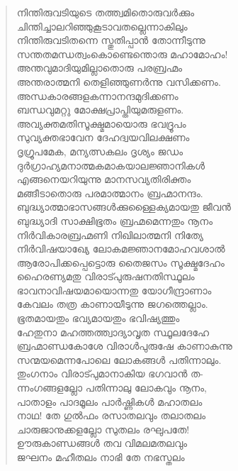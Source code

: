 \begin{verse}
നിന്തിരുവടിയുടെ തത്ത്വമിതൊരുവര്‍ക്കും\\
ചിന്തിച്ചാലറിഞ്ഞുകൂടാവതല്ലെന്നാകിലും\\
നിന്തിരുവടിതന്നെ സ്തുതിപ്പാന്‍ തോന്നീടുന്നു\\
സന്തതമന്ധത്വംകൊണ്ടെന്തൊരു മഹാമോഹം!\\
അന്തവുമാദിയുമില്ലാതൊരു പരബ്രഹ്മം\\
അന്തരാത്മനി തെളിഞ്ഞുണര്‍ന്നു വസിക്കണം.\\
അന്ധകാരങ്ങളകന്നാനന്ദമുദിക്കണം\\
ബന്ധവുമറ്റു മോക്ഷപ്രാപ്തിയുമരുളണം.\\
അവ്യക്തമതിസൂക്ഷ്മമായൊരു ഭവദ്രൂപം\\
സുവ്യക്തഭാവേന ദേഹദ്വയവിലക്ഷണം\\
ദൃഗ്രൂപമേക, മന്യത്സകലം ദൃശ്യം ജഡം\\
ദുര്‍ഗ്രാഹ്യമനാത്മകമാകയാലജ്ഞാനികള്‍\\
എങ്ങനെയറിയുന്നു മാനസവ്യതിരിക്തം\\
മങ്ങീടാതൊരു പരമാത്മാനം ബ്രഹ്മാനന്ദം.\\
ബുദ്ധ്യാത്മാഭാസങ്ങള്‍ക്കുള്ളൈക്യമായതു ജീവന്‍\\
ബുദ്ധ്യാദി സാക്ഷിഭൂതം ബ്രഹ്മമെന്നതും നൂനം\\
നിര്‍വികാരബ്രഹ്മണി നിഖിലാത്മനി നിത്യേ\\
നിര്‍വിഷയാഖ്യേ ലോകമജ്ഞാനമോഹവശാല്‍\\
ആരോപിക്കപ്പെട്ടൊരു തൈജസം സൂക്ഷ്മദേഹം\\
ഹൈരണ്യമതു വിരാട്പുരുഷനതിസ്ഥൂലം\\
ഭാവനാവിഷയമായൊന്നതു യോഗീന്ദ്രാണാം\\
കേവലം തത്ര കാണായീടുന്നു ജഗത്തെല്ലാം.\\
ഭൂതമായതും ഭവ്യമായതും ഭവിഷ്യത്തും\\
ഹേതുനാ മഹത്തത്ത്വാദ്യാവൃത സ്ഥൂലദേഹേ\\
ബ്രഹ്മാണ്ഡകോശേ വിരാള്‍പുരുഷേ കാണാകുന്നു\\
സന്മയമെന്നപോലെ ലോകങ്ങള്‍ പതിന്നാലും.\\
തുംഗനാം വിരാട്പുമാനാകിയ ഭഗവാന്‍ ത-\\
ന്നംഗങ്ങളല്ലോ പതിന്നാലു ലോകവും നൂനം,\\
പാതാളം പാദമൂലം പാര്‍ഷ്ണികള്‍ മഹാതലം\\
നാഥ! തേ ഗുല്‍ഫം രസാതലവും തലാതലം\\
ചാരുജാനുക്കളല്ലോ സുതലം രഘുപതേ!\\
ഊരുകാണ്ഡങ്ങള്‍ തവ വിമലമതലവും\\
ജഘനം മഹീതലം നാഭി തേ നഭസ്തലം\\

\end{verse}
